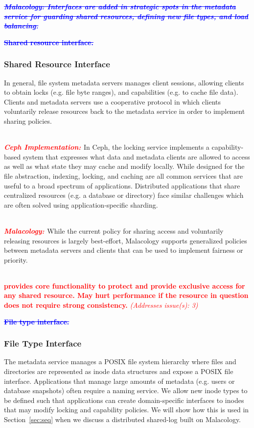 \documentclass[preprint]{sigplanconf-eurosys}
\newcommand{\newcomment}[1]{{\textcolor{red}{\textbf{#1}}}}
\newcommand{\oldcomment}[1]{{\textcolor{blue}{\textbf{\sout{#1}}}}}
\newcommand{\addressesissue}[1]{{\textcolor{red}{{\it (Addresses issue(s): {#1})}}}}
\begin{document}
\oldcomment{\it{\textbf{Malacology:}} Interfaces are added in strategic spots in the
metadata service for guarding shared resources, defining new file types,
and load balancing.}

\oldcomment{\noindent Shared resource interface.}
\subsubsection{Shared Resource Interface}

In general, file system metadata servers manages client sessions, allowing
clients to obtain locks (e.g. file byte ranges), and capabilities (e.g. to
cache file data). Clients and metadata servers use a cooperative protocol in
which clients voluntarily release resources back to the metadata service in
order to implement sharing policies. 

\newcomment{\\ \noindent\it{\textbf{Ceph Implementation: }}}
In Ceph, the locking service implements a capability-based system that
expresses what data and metadata clients are allowed to access as well as what
state they may cache and modify locally.  While designed for the file
abstraction, indexing, locking, and caching are all common services that are
useful to a broad spectrum of applications.  Distributed applications that
share centralized resources (e.g. a database or directory) face similar
challenges which are often solved using application-specific sharding.

\newcomment{\\ \noindent\it{\textbf{Malacology: }}}
While the current policy for sharing access and voluntarily releasing resources
is largely best-effort, Malacology supports generalized policies between
metadata servers and clients that can be used to implement fairness or
priority.

\newcomment{\\  provides core functionality
to protect and provide exclusive access for any shared resource. May hurt
performance if the resource in question does not require strong consistency.}
\addressesissue{3}

\oldcomment{\noindent File type interface.}
\subsubsection{File Type Interface}
The metadata service manages a POSIX file system hierarchy where files and
directories are represented as inode data structures and expose a POSIX file
interface. Applications that manage large amounts of metadata (e.g. users or
database snapshots) often require a naming service. We allow new inode types to
be defined such that applications can create domain-specific interfaces to
inodes that may modify locking and capability policies. We will show how this
is used in Section~\ref{sec:seq} when we discuss a distributed shared-log built
on Malacology.
\end{document}
